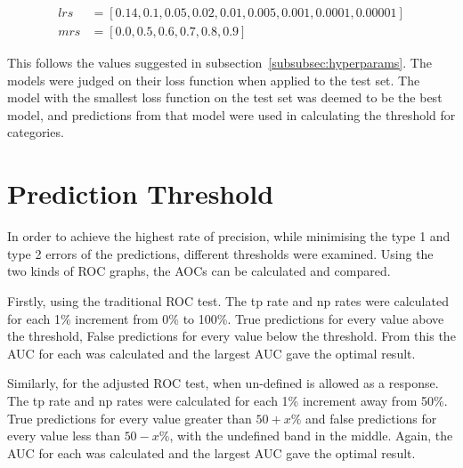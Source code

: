 \begin{align*}
    lrs &= [0.14, 0.1, 0.05, 0.02, 0.01, 0.005, 0.001, 0.0001, 0.00001]  \\
    mrs &= [0.0, 0.5, 0.6, 0.7, 0.8, 0.9]
\end{align*}

This follows the values suggested in subsection~\ref{subsubsec:hyperparams}. The models were judged on their loss function when applied to the test set. The model with the smallest loss function on the test set was deemed to be the best model, and predictions from that model were used in calculating the threshold for categories.

\section{Prediction Threshold}

In order to achieve the highest rate of precision, while minimising the type 1 and type 2 errors of the predictions, different thresholds were examined. Using the two kinds of ROC graphs, the AOCs can be calculated and compared.

Firstly, using the traditional ROC test. The tp rate and np rates were calculated for each 1\% increment from 0\% to 100\%. True predictions for every value above the threshold, False predictions for every value below the threshold. From this the AUC for each was calculated and the largest AUC gave the optimal result.

Similarly, for the adjusted ROC test, when un-defined is allowed as a response. The tp rate and np rates were calculated for each 1\% increment away from 50\%. True predictions for every value greater than $50+x\%$ and false predictions for every value less than $50-x\%$, with the undefined band in the middle. Again, the AUC for each was calculated and the largest AUC gave the optimal result.


